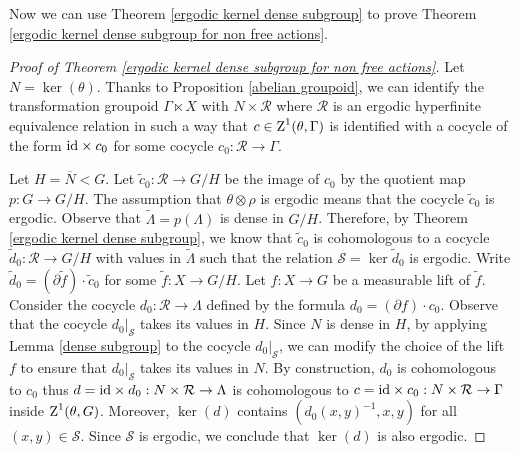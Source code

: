 \documentclass[a4paper,11pt]{amsart}
\numberwithin{equation}{section}
\theoremstyle{definition}
\newcommand{\cS}{\mathcal{S}}
\newcommand{\id}{\text{\rm id}}
\newcommand{\rZ}{\mathord{\text{\rm Z}}}
\newcommand{\cR}{\mathcal{R}}
\begin{document}
Now we can use Theorem \ref{ergodic kernel dense subgroup} to prove Theorem \ref{ergodic kernel dense subgroup for non free actions}.

\begin{proof}[Proof of Theorem \ref{ergodic kernel dense subgroup for non free actions}]
Let $N=\ker( \theta)$. Thanks to Proposition \ref{abelian groupoid}, we can identify the transformation groupoid $\Gamma \ltimes X$ with $N \times \cR$ where $\cR$ is an ergodic hyperfinite equivalence relation in such a way that $c \in \rZ^1(\theta,\Gamma)$ is identified with a cocycle of the form $\id \times c_0$ for some cocycle $c_0 : \cR \rightarrow \Gamma$. 

Let $H=\overline{N} < G$. Let $\widetilde{c}_0 : \cR \rightarrow G/H$ be the image of $c_0$ by the quotient map $ p : G \rightarrow G/H$. The assumption that $\theta \otimes \rho$ is ergodic means that the cocycle $\widetilde{c}_0$ is ergodic. Observe that $\widetilde{\Lambda}=p(\Lambda)$ is dense in $G/H$. Therefore, by Theorem \ref{ergodic kernel dense subgroup}, we know that $\widetilde{c}_0$ is cohomologous to a cocycle $\widetilde{d}_0 : \cR \rightarrow G/H$ with values in $\widetilde{\Lambda}$ such that the relation $\cS = \ker{\widetilde{d}_0}$ is ergodic. Write $\widetilde{d}_0 = (\partial \widetilde{f}) \cdot \widetilde{c}_0 $ for some $\widetilde{f} : X \rightarrow G/H$. Let $f : X \rightarrow G$ be a measurable lift of $\widetilde{f}$. Consider the cocycle $d_0 : \cR \rightarrow \Lambda$ defined by the formula $d_0 = (\partial f) \cdot c_0$. Observe that the cocycle $d_0|_{\cS}$ takes its values in $H$. Since $N$ is dense in $H$, by applying Lemma \ref{dense subgroup} to the cocycle $d_0|_{\cS}$, we can modify the choice of the lift $f$ to ensure that $d_0|_{\cS}$ takes its values in $N$. By construction, $d_0$ is cohomologous to $c_0$ thus $d = \id \times d_0 : N \times \cR \rightarrow \Lambda$ is cohomologous to $c = \id \times c_0 : N \times \cR \rightarrow \Gamma$ inside $\rZ^1(\theta,G)$. Moreover, $\ker(d)$ contains $(d_0(x,y)^{-1}, x,y)$ for all $(x,y) \in \cS$. Since $\cS$ is ergodic, we conclude that $\ker(d)$ is also ergodic.
\end{proof}
\end{document}
